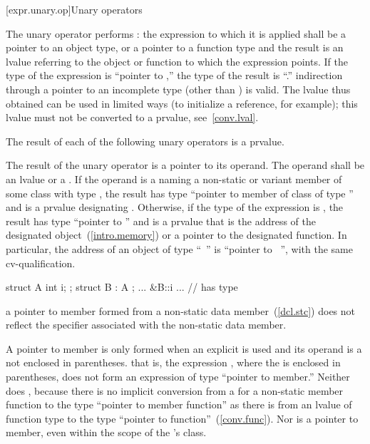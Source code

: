 [expr.unary.op]{Unary operators}

\pnum
{}%
%
The unary \tcode{*} operator performs :
%
%
the expression to which it is applied shall be a pointer to an object
type, or a pointer to a function type and the result is an lvalue
referring to the object or function to which the expression points. If
the type of the expression is ``pointer to ,'' the type of the
result is ``.''
\enternote 
{}%
indirection through a pointer to an incomplete type (other than
 ) is valid. The lvalue thus obtained can be
used in limited ways (to initialize a reference, for example); this
lvalue must not be converted to a prvalue, see~\ref{conv.lval}.
\exitnote 

\pnum
The result of each of the following unary operators is a prvalue.

\pnum
{}%
%
The result of the unary \tcode{\&} operator is a pointer to its operand.
The operand shall be an lvalue or a .
If the operand is a  naming a non-static or variant member 
of some class  with type , the result has type ``pointer to member
of class  of type '' and is a prvalue designating .
Otherwise, if the type of the expression is , the result has type ``pointer to
'' and is a prvalue that is the address of the designated object~(\ref{intro.memory})
or a pointer to the designated function. \enternote In particular, the address of an
object of type ``\cv\ '' is ``pointer to \cv\ '', with the same
cv-qualification. \exitnote
\enterexample 

\begin{codeblock}
struct A { int i; };
struct B : A { };
... &B::i ...       // has type 
\end{codeblock}
\exitexample 
\enternote 
a pointer to member formed from a  non-static data
member~(\ref{dcl.stc}) does not reflect the  specifier
associated with the non-static data member.
\exitnote 

\pnum
A pointer to member is only formed when an explicit \tcode{\&} is used
and its operand is a  not enclosed in
parentheses.
\enternote 
that is, the expression , where the
 is enclosed in parentheses, does not form an
expression of type ``pointer to member.'' Neither does
, because there is no implicit conversion from a
 for a non-static member function to the type
``pointer to member function'' as there is from an lvalue of function
type to the type ``pointer to function''~(\ref{conv.func}). Nor is
 a pointer to member, even within the scope of
the 's class.
\exitnote 

